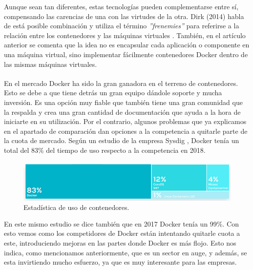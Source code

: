 \documentclass[11pt,a4paper]{article}
\begin{document}
Aunque sean tan diferentes, estas tecnologías pueden complementarse entre sí, compensando las carencias de una con las virtudes de la otra. Dirk (2014) habla de está posible combinación y utiliza el término \emph{''frenemies''} para referirse a la relación entre los contenedores y las máquinas virtuales \cite{merkel2014docker}. También, en el artículo anterior se comenta que la idea no es encapsular cada aplicación o componente en una máquina virtual, sino implementar fácilmente contenedores Docker dentro de las mismas máquinas virtuales.\\\\
En el mercado Docker ha sido la gran ganadora en el terreno de contenedores. Esto se debe a que tiene detrás un gran equipo dándole soporte y mucha inversión. Es una opción muy fiable que también tiene una gran comunidad que la respalda y crea una gran cantidad de documentación que ayuda a la hora de iniciarte en su utilización. Por el contrario, algunos problemas que ya explicamos en el apartado de comparación dan opciones a la competencia a quitarle parte de la cuota de mercado. Según un estudio de la empresa Sysdig \cite{sysdigUsage}, Docker tenía un total del 83\% del tiempo de uso respecto a la competencia en 2018.

\begin{figure}[H]
	\centering
	\includegraphics[scale=0.5]{images/usoDocker.png}
	\caption[Estadística de uso de contenedores.]{Estadística de uso de contenedores.}
	\label{fig:usoDocker}
\end{figure}

En este mismo estudio se dice también que en 2017 Docker tenía un 99\%. Con esto vemos como los competidores de Docker están intentando quitarle cuota a este, introduciendo mejoras en las partes donde Docker es más flojo. Esto nos indica, como mencionamos anteriormente, que es un sector en auge, y además, se esta invirtiendo mucho esfuerzo, ya que es muy interesante para las empresas.
\\\\
\clearpage
\newpage


\end{document}
